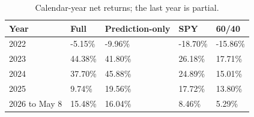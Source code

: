 \begin{table}[htbp]
\caption{Calendar-year net returns; the last year is partial.}
\label{tab:yearly}
\begin{tabular}{lllll}
\toprule
Year & Full & Prediction-only & SPY & 60/40 \\
\midrule
2022 & -5.15\% & -9.96\% & -18.70\% & -15.86\% \\
2023 & 44.38\% & 41.80\% & 26.18\% & 17.71\% \\
2024 & 37.70\% & 45.88\% & 24.89\% & 15.01\% \\
2025 & 9.74\% & 19.56\% & 17.72\% & 13.80\% \\
2026 to May 8 & 15.48\% & 16.04\% & 8.46\% & 5.29\% \\
\bottomrule
\end{tabular}
\end{table}
